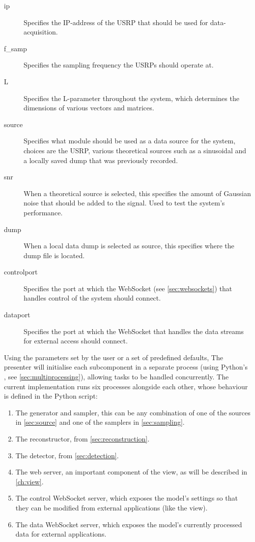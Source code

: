 \documentclass[a4paper, openany, oneside]{memoir}
\begin{document}
\begin{description}
	\item[ip] Specifies the IP-address of the USRP that should be used for data-acquisition.
	\item[f\_samp] Specifies the sampling frequency the USRPs should operate at.
	\item[L] Specifies the L-parameter throughout the system, which determines the dimensions of various vectors and matrices.
	\item[source] Specifies what module should be used as a data source for the system, choices are the USRP, various theoretical sources such as a sinusoidal and a locally saved dump that was previously recorded.
	\item[snr] When a theoretical source is selected, this specifies the amount of Gaussian noise that should be added to the signal. Used to test the system's performance.
	\item[dump] When a local data dump is selected as source, this specifies where the dump file is located.
	\item[controlport] Specifies the port at which the WebSocket (see \cref{sec:websockets}) that handles control of the system should connect.
	\item[dataport] Specifies the port at which the WebSocket that handles the data streams for external access should connect.
\end{description}

Using the parameters set by the user or a set of predefined defaults, The presenter will initialise each subcomponent in a separate process (using Python's , see \cref{sec:multiprocessing}), allowing tasks to be handled concurrently. The current implementation runs six processes alongside each other, whose behaviour is defined in the  Python script:

\begin{enumerate}
	\item The generator and sampler, this can be any combination of one of the sources in \cref{sec:source} and one of the samplers in \cref{sec:sampling}.
	\item The reconstructor, from \cref{sec:reconstruction}.
	\item The detector, from \cref{sec:detection}.
	\item The web server, an important component of the view, as will be described in \cref{ch:view}.
	\item The control WebSocket server, which exposes the model's settings so that they can be modified from external applications (like the view).
	\item The data WebSocket server, which exposes the model's currently processed data for external applications.
\end{enumerate}
\end{document}
